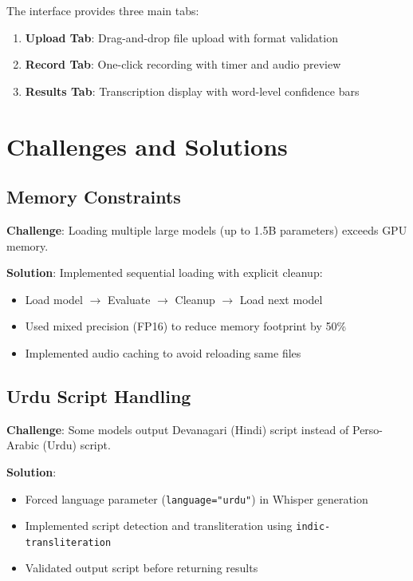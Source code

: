 The interface provides three main tabs:

\begin{enumerate}
    \item \textbf{Upload Tab}: Drag-and-drop file upload with format validation
    \item \textbf{Record Tab}: One-click recording with timer and audio preview
    \item \textbf{Results Tab}: Transcription display with word-level confidence bars
\end{enumerate}

\section{Challenges and Solutions}

\subsection{Memory Constraints}

\textbf{Challenge}: Loading multiple large models (up to 1.5B parameters) exceeds GPU memory.

\textbf{Solution}: Implemented sequential loading with explicit cleanup:
\begin{itemize}
    \item Load model $\rightarrow$ Evaluate $\rightarrow$ Cleanup $\rightarrow$ Load next model
    \item Used mixed precision (FP16) to reduce memory footprint by 50\%
    \item Implemented audio caching to avoid reloading same files
\end{itemize}

\subsection{Urdu Script Handling}

\textbf{Challenge}: Some models output Devanagari (Hindi) script instead of Perso-Arabic (Urdu) script.

\textbf{Solution}: 
\begin{itemize}
    \item Forced language parameter (\texttt{language="urdu"}) in Whisper generation
    \item Implemented script detection and transliteration using \texttt{indic-transliteration}
    \item Validated output script before returning results
\end{itemize}

